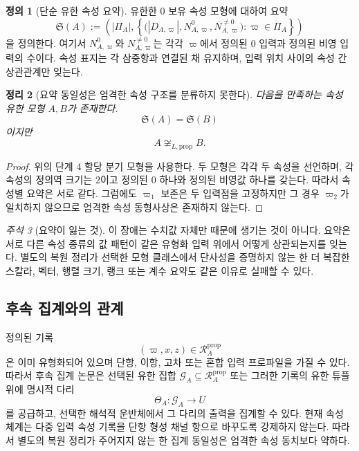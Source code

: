 \documentclass[11pt]{article}
\newcommand{\PropRec}{\mathcal R^{\mathrm{prop}}}
\newtheorem{theorem}{정리}[section]
\theoremstyle{definition}
\newtheorem{definition}[theorem]{정의}
\theoremstyle{remark}
\newtheorem{remark}[theorem]{주석}
\begin{document}
\begin{definition}[단순 유한 속성 요약]
유한한 0 보유 속성 모형에 대하여 요약
\[
\mathfrak S(A):=
\left(
|\Pi_A|,
\left\{
\bigl(|D_{A,\varpi}|,N^0_{A,\varpi},N^{\neq0}_{A,\varpi}\bigr)
:\varpi\in\Pi_A
\right\}
\right)
\]
을 정의한다.
여기서 \(N^0_{A,\varpi}\)와 \(N^{\neq0}_{A,\varpi}\)는 각각 \(\varpi\)에서 정의된 0 입력과 정의된 비영 입력의 수이다.
속성 표지는 각 삼중항과 연결된 채 유지하며, 입력 위치 사이의 속성 간 상관관계만 잊는다.
\end{definition}

\begin{theorem}[요약 동일성은 엄격한 속성 구조를 분류하지 못한다]
\label{thm:compression}
다음을 만족하는 속성 유한 모형 \(A,B\)가 존재한다.
\[
\mathfrak S(A)=\mathfrak S(B)
\]
이지만
\[
A\not\cong_{L,\mathrm{prop}}B.
\]
\end{theorem}

\begin{proof}
위의 단계 4 할당 분기 모형을 사용한다.
두 모형은 각각 두 속성을 선언하며, 각 속성의 정의역 크기는 2이고 정의된 0 하나와 정의된 비영값 하나를 갖는다.
따라서 속성별 요약은 서로 같다.
그럼에도 \(\varpi_1\) 보존은 두 입력점을 고정하지만 그 경우 \(\varpi_2\)가 일치하지 않으므로 엄격한 속성 동형사상은 존재하지 않는다.
\end{proof}

\begin{remark}[요약이 잃는 것]
이 장애는 수치값 자체만 때문에 생기는 것이 아니다.
요약은 서로 다른 속성 종류의 값 패턴이 같은 유형화 입력 위에서 어떻게 상관되는지를 잊는다.
별도의 복원 정리가 선택한 모형 클래스에서 단사성을 증명하지 않는 한 더 복잡한 스칼라, 벡터, 행렬 크기, 랭크 또는 계수 요약도 같은 이유로 실패할 수 있다.
\end{remark}

\subsection{후속 집계와의 관계}

정의된 기록
\[
(\varpi,x,z)\in\PropRec_A
\]
은 이미 유형화되어 있으며 단항, 이항, 고차 또는 혼합 입력 프로파일을 가질 수 있다.
따라서 후속 집계 논문은 선택된 유한 집합 \(\mathcal G_A\subseteq\PropRec_A\) 또는 그러한 기록의 유한 튜플 위에 명시적 다리
\[
\Theta_A:\mathcal G_A\longrightarrow U
\]
를 공급하고, 선택한 해석적 운반체에서 그 다리의 출력을 집계할 수 있다.
현재 속성 체계는 다중 입력 속성 기록을 단항 형성 채널 항으로 바꾸도록 강제하지 않는다.
따라서 별도의 복원 정리가 주어지지 않는 한 집계 동일성은 엄격한 속성 동치보다 약하다.
\end{document}
